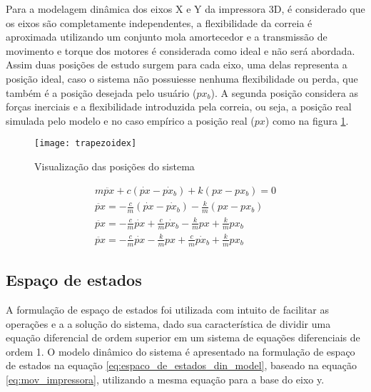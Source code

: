 Para a modelagem dinâmica dos eixos X e Y da impressora 3D, 
é considerado que os eixos são completamente independentes, 
a flexibilidade da correia é aproximada utilizando um conjunto 
mola amortecedor e a transmissão de movimento e torque dos 
motores é considerada como ideal e não será abordada.
Assim duas posições de estudo surgem para cada eixo, uma delas 
representa a posição ideal, caso o sistema não possuiesse nenhuma flexibilidade
ou perda, que também é a posição desejada pelo usuário ($px_b$). 
A segunda posição considera as forças inerciais e a 
flexibilidade introduzida pela correia, ou seja, a posição real simulada pelo modelo
e no caso empírico a posição real ($px$) como na figura \ref{fig:din_model}.


\begin{figure}[!htb]
    \centering
    \caption{Visualização das posições do sistema}
    \texttt{[image: trapezoidex]}

    \label{fig:din_model}
\end{figure}

\begin{multline}
    \label{eq:mov_impressora}
    m \ddot{px} + c(\dot{px} - \dot{px_b}) + k(px-px_b) = 0 \\
    \ddot{px}  = - \frac{c}{m}(\dot{px} - \dot{px_b}) - \frac{k}{m}(px-px_b) \\
    \ddot{px}  = - \frac{c}{m} \dot{px} + \frac{c}{m} \dot
    {px_b} - \frac{k}{m} px + \frac{k}{m} px_b \\
    \ddot{px}  = - \frac{c}{m} \dot{px} - \frac{k}{m} px + \frac{c}{m} \dot{px_b} + \frac{k}{m} px_b
\end{multline}

\subsection{Espaço de estados}
A formulação de espaço de estados foi utilizada com intuito de facilitar as operações e
a a solução do sistema, dado sua característica de dividir uma equação diferencial
de ordem superior em um sistema de equações diferenciais de ordem 1.
O modelo dinâmico do sistema é apresentado na formulação de espaço de estados 
na equação \ref{eq:espaco_de_estados_din_model}, baseado na equação \ref{eq:mov_impressora},
utilizando a mesma equação para a base do eixo y.

